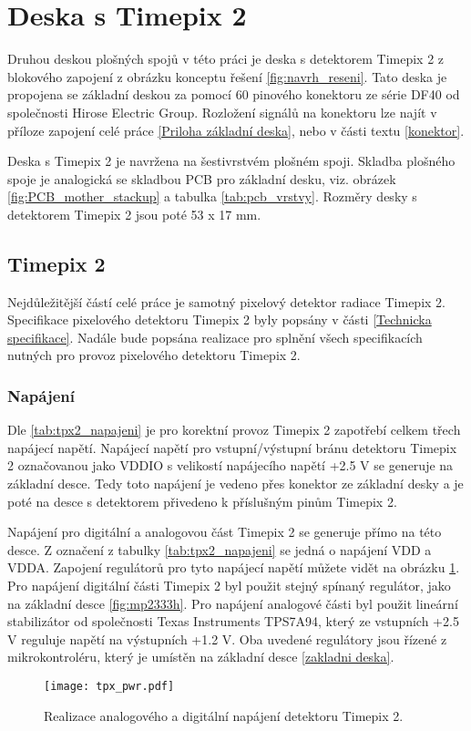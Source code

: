 \section{Deska s Timepix 2}
	\label{Deska s Timepix2}
	Druhou deskou plošných spojů v této práci je deska s detektorem Timepix 2 z blokového zapojení z obrázku konceptu řešení \ref{fig:navrh_reseni}. Tato deska je propojena se základní deskou za pomocí 60 pinového konektoru ze série DF40 od společnosti Hirose Electric Group. Rozložení signálů na konektoru lze najít v příloze zapojení celé práce \ref{Priloha základní deska}, nebo v části textu \ref{konektor}.
	
	\par Deska s Timepix 2 je navržena na šestivrstvém plošném spoji. Skladba plošného spoje je analogická se skladbou PCB pro základní desku, viz. obrázek \ref{fig:PCB_mother_stackup} a tabulka \ref{tab:pcb_vrstvy}. Rozměry desky s detektorem Timepix 2 jsou poté 53 x 17 mm. 
\subsection{Timepix 2}	%
	Nejdůležitější částí celé práce je samotný pixelový detektor radiace Timepix 2. Specifikace pixelového detektoru Timepix 2 byly popsány v části \ref{Technicka specifikace}. Nadále bude popsána realizace pro splnění všech specifikacích nutných pro provoz pixelového detektoru Timepix 2.
	\subsubsection{Napájení}	%
	Dle \ref{tab:tpx2_napajeni} je pro korektní provoz Timepix 2 zapotřebí celkem třech napájecí napětí. Napájecí napětí pro vstupní/výstupní bránu detektoru Timepix 2 označovanou jako VDDIO s velikostí napájecího napětí +2.5 V se generuje na základní desce. Tedy toto napájení je vedeno přes konektor ze základní desky a je poté na desce s detektorem přivedeno k příslušným pinům Timepix 2.
	\par Napájení pro digitální a analogovou část Timepix 2 se generuje přímo na této desce. Z označení z tabulky \ref{tab:tpx2_napajeni} se jedná o napájení VDD a VDDA. Zapojení regulátorů pro tyto napájecí napětí můžete vidět na obrázku \ref{fig:tpx_pwr}. Pro napájení digitální části Timepix 2 byl použit stejný spínaný regulátor, jako na základní desce \ref{fig:mp2333h}. Pro napájení analogové části byl použit lineární stabilizátor od společnosti Texas Instruments TPS7A94, který ze vstupních +2.5 V reguluje napětí na výstupních +1.2 V. Oba uvedené regulátory jsou řízené z mikrokontroléru, který je umístěn na základní desce \ref{zakladni deska}.
	\begin{figure}[h!]
		\centering
		\captionsetup{justification=centering}
		\texttt{[image: tpx\_pwr.pdf]}
		\caption{Realizace analogového a digitální napájení detektoru Timepix 2.} 
		\label{fig:tpx_pwr}
	\end{figure} 
